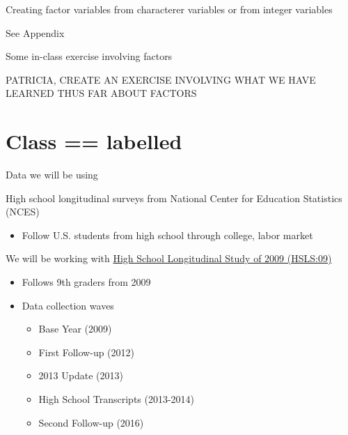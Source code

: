 \documentclass[8pt,ignorenonframetext,dvipsnames]{beamer}
\providecommand{\tightlist}{%
  \setlength{\itemsep}{0pt}\setlength{\parskip}{0pt}}
\let\olditem\item
\renewcommand{\item}{%
  \olditem\vspace{4pt}
}
\begin{document}
\begin{frame}{Creating factor variables from characterer variables or
from integer variables}

See Appendix

\end{frame}

\begin{frame}{Some in-class exercise involving factors}

PATRICIA, CREATE AN EXERCISE INVOLVING WHAT WE HAVE LEARNED THUS FAR
ABOUT FACTORS

\end{frame}

\section{Class == labelled}\label{class-labelled}

\begin{frame}{Data we will be using}

High school longitudinal surveys from National Center for Education
Statistics (NCES)

\begin{itemize}
\tightlist
\item
  Follow U.S. students from high school through college, labor market
\end{itemize}

We will be working with
\href{https://nces.ed.gov/surveys/hsls09/index.asp}{High School
Longitudinal Study of 2009 (HSLS:09)}

\begin{itemize}
\tightlist
\item
  Follows 9th graders from 2009
\item
  Data collection waves

  \begin{itemize}
  \tightlist
  \item
    Base Year (2009)
  \item
    First Follow-up (2012)
  \item
    2013 Update (2013)
  \item
    High School Transcripts (2013-2014)
  \item
    Second Follow-up (2016)
  \end{itemize}
\end{itemize}

\end{frame}
\end{document}
